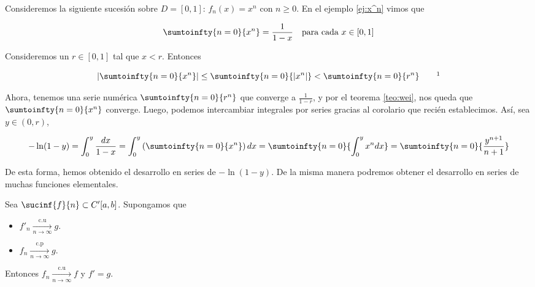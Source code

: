\begin{ejem}
    Consideremos la siguiente sucesión sobre $D = [0,1]$: $f_n(x) = x^n$ con $n \geq 0$. En el ejemplo \ref{ej:x^n} vimos que
    
    \[
    \sumtoinfty{n=0}{x^n} = \frac{1}{1-x} \quad \text{para cada $x \in [0,1]$}
    \]
    
    Consideremos un $r \in [0,1]$ tal que $x < r$. Entonces
    
    \[
    \left| \sumtoinfty{n=0}{x^n} \right| \leq \sumtoinfty{n=0}{|x^n|} < \sumtoinfty{n=0}{r^n} \qquad \footnotemark
    \]
    
    Ahora, tenemos una serie numérica $\sumtoinfty{n=0}{r^n}$ que converge a $\frac{1}{1-r}$, y por el teorema \ref{teo:wei}, nos queda que $\sumtoinfty{n=0}{x^n}$ converge. Luego, podemos intercambiar integrales por series gracias al corolario que recién establecimos. Así, sea $y \in (0, r)$,
    
    \[
    -\ln(1-y) = \int_0^y \frac{dx}{1-x} = \int_0^y \left( \sumtoinfty{n=0}{x^n}\right)dx = \sumtoinfty{n=0}{\int_0^y x^ndx} = \sumtoinfty{n=0}{\frac{y^{n+1}}{n+1}}
    \]
    
    De esta forma, hemos obtenido el desarrollo en series de $-\ln(1-y)$. De la misma manera podremos obtener el desarrollo en series de muchas funciones elementales.
\end{ejem}

\begin{teo}
    Sea $\sucinf{f}{n} \subset C'[a,b]$. Supongamos que
    
    \begin{itemize}
        \item $f'_n \xrightarrow[n \to \infty]{\text{c.u}} g$.
        \item $f_n \xrightarrow[n \to \infty]{\text{c.p}} g$.
    \end{itemize}
    
    Entonces $f_n \xrightarrow[n \to \infty]{\text{c.u}} f$ y $f' = g$.
\end{teo}


